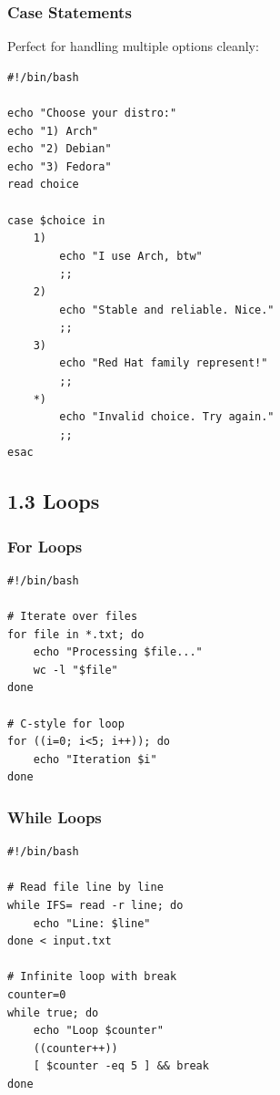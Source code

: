 \documentclass[12pt]{article}
\begin{document}
\subsubsection*{Case Statements}

Perfect for handling multiple options cleanly:

\begin{highlightbox}
\begin{verbatim}
#!/bin/bash

echo "Choose your distro:"
echo "1) Arch"
echo "2) Debian"
echo "3) Fedora"
read choice

case $choice in
    1)
        echo "I use Arch, btw"
        ;;
    2)
        echo "Stable and reliable. Nice."
        ;;
    3)
        echo "Red Hat family represent!"
        ;;
    *)
        echo "Invalid choice. Try again."
        ;;
esac
\end{verbatim}
\end{highlightbox}

\subsection*{1.3 Loops}

\subsubsection*{For Loops}

\begin{highlightbox}
\begin{verbatim}
#!/bin/bash

# Iterate over files
for file in *.txt; do
    echo "Processing $file..."
    wc -l "$file"
done

# C-style for loop
for ((i=0; i<5; i++)); do
    echo "Iteration $i"
done
\end{verbatim}
\end{highlightbox}

\subsubsection*{While Loops}

\begin{highlightbox}
\begin{verbatim}
#!/bin/bash

# Read file line by line
while IFS= read -r line; do
    echo "Line: $line"
done < input.txt

# Infinite loop with break
counter=0
while true; do
    echo "Loop $counter"
    ((counter++))
    [ $counter -eq 5 ] && break
done
\end{verbatim}
\end{highlightbox}
\end{document}
